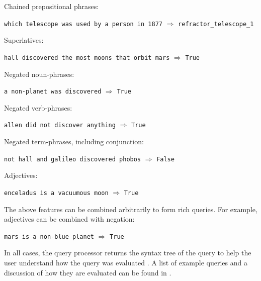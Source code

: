 \documentclass[../main.tex]{subfiles}
\begin{document}
\begin{refsection}
\examplespacing

\noindent Chained prepositional phrases:

\examplespacing

\texttt{which telescope was used by a person in 1877} $\Rightarrow$ \texttt{refractor\_telescope\_1}

\noindent Superlatives:

\examplespacing

\texttt{hall discovered the most moons that orbit mars} $\Rightarrow$ \texttt{True}

\examplespacing

\noindent Negated noun-phrases:

\examplespacing

\texttt{a non-planet was discovered} $\Rightarrow$ \texttt{True}

\examplespacing

\noindent Negated verb-phrases:

\examplespacing

\texttt{allen did not discover anything} $\Rightarrow$ \texttt{True}

\examplespacing

\noindent Negated term-phrases, including conjunction:

\examplespacing

\texttt{not hall and galileo discovered phobos} $\Rightarrow$ \texttt{False}

\examplespacing

\noindent Adjectives:

\examplespacing

\texttt{enceladus is a vacuumous moon} $\Rightarrow$ \texttt{True}

\examplespacing

\noindent The above features can be combined arbitrarily to form rich queries.
For example, adjectives can be combined with negation:

\examplespacing

\texttt{mars is a non-blue planet} $\Rightarrow$ \texttt{True}

\examplespacing

\noindent In all cases, the query processor returns the syntax tree of the query to help the user understand how the query was evaluated \cite{peelar2020compositional}.  A list of example queries and a discussion of how they are evaluated can be found in .




\end{refsection}
\end{document}
